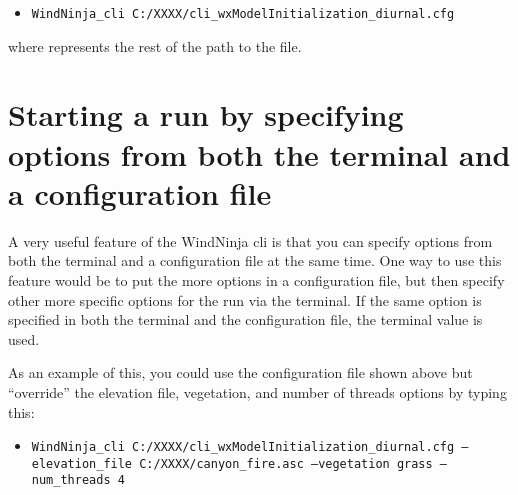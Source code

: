 \begin{itemize}
\item[] \texttt{WindNinja\_cli C:/XXXX/cli\_wxModelInitialization\_diurnal.cfg}
\end{itemize}

where  represents the rest of the path to the file.

\section*{Starting a run by specifying options from both the terminal and a configuration file}

A very useful feature of the WindNinja cli is that you can specify options from both the terminal and a configuration file at the same time.  One way to use this feature would be to put the more  options in a configuration file, but then specify  other more specific options for the run via the terminal.  If the same option is specified in both the terminal and the configuration file, the terminal value is used.

As an example of this, you could use the configuration file shown above but “override” the elevation file, vegetation, and number of threads options by typing this:

\begin{itemize}
\item[] \texttt{WindNinja\_cli C:/XXXX/cli\_wxModelInitialization\_diurnal.cfg  --elevation\_file C:/XXXX/canyon\_fire.asc --vegetation grass --num\_threads 4}
\end{itemize}

